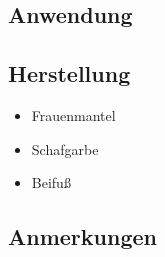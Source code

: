 \subsection{Anwendung}

\subsection{Herstellung}

\begin{itemize}
	\item Frauenmantel 
	\item Schafgarbe
	\item Beifuß
\end{itemize}

\subsection{Anmerkungen}

